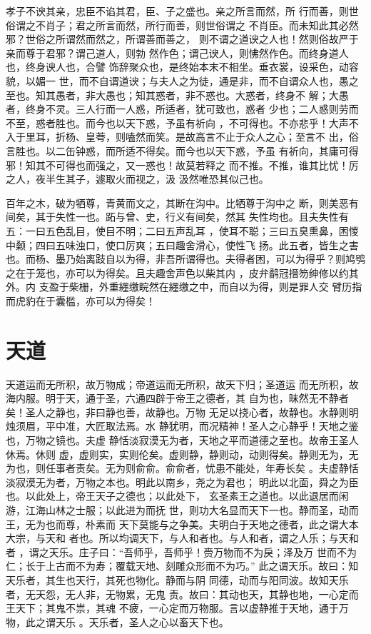 \documentclass[a4paper,12pt,UTF8,twoside]{ctexbook}
\begin{document}
孝子不谀其亲，忠臣不谄其君，臣、子之盛也。亲之所言而然，所 行而善，则世俗谓之不肖子；君之所言而然，所行而善，则世俗谓之 不肖臣。而未知此其必然邪？世俗之所谓然而然之，所谓善而善之， 则不谓之道谀之人也！然则俗故严于亲而尊于君邪？谓己道人，则勃 然作色；谓己谀人，则怫然作色。而终身道人也，终身谀人也，合譬 饰辞聚众也，是终始本末不相坐。垂衣裳，设采色，动容貌，以媚一 世，而不自谓道谀；与夫人之为徒，通是非，而不自谓众人也，愚之 至也。知其愚者，非大愚也；知其惑者，非不惑也。大惑者，终身不 解；大愚者，终身不灵。三人行而一人惑，所适者，犹可致也，惑者 少也；二人惑则劳而不至，惑者胜也。而今也以天下惑，予虽有祈向 ，不可得也。不亦悲乎！大声不入于里耳，折杨、皇荂，则嗑然而笑。是故高言不止于众人之心；至言不 出，俗言胜也。以二缶钟惑，而所适不得矣。而今也以天下惑，予虽 有祈向，其庸可得邪！知其不可得也而强之，又一惑也！故莫若释之 而不推。不推，谁其比忧！厉之人，夜半生其子，遽取火而视之，汲 汲然唯恐其似己也。

百年之木，破为牺尊，青黄而文之，其断在沟中。比牺尊于沟中之 断，则美恶有间矣，其于失性一也。跖与曾、史，行义有间矣，然其 失性均也。且夫失性有五：一曰五色乱目，使目不明；二曰五声乱耳 ，使耳不聪；三曰五臭熏鼻，困惾中颡；四曰五味浊口，使口厉爽；五曰趣舍滑心，使性飞 扬。此五者，皆生之害也。而杨、墨乃始离跂自以为得，非吾所谓得也。夫得者困，可以为得乎？则鸠鸮之在于笼也，亦可以为得矣。且夫趣舍声色以柴其内 ，皮弁鹬冠搢笏绅修以约其外。内 支盈于柴栅，外重纆缴睆然在纆缴之中，而自以为得，则是罪人交 臂历指而虎豹在于囊槛，亦可以为得矣！

\section{天道}

天道运而无所积，故万物成；帝道运而无所积，故天下归；圣道运 而无所积，故海内服。明于天，通于圣，六通四辟于帝王之德者，其 自为也，昧然无不静者矣！圣人之静也，非曰静也善，故静也。万物 无足以挠心者，故静也。水静则明烛须眉，平中准，大匠取法焉。水 静犹明，而况精神！圣人之心静乎！天地之鉴也，万物之镜也。夫虚 静恬淡寂漠无为者，天地之平而道德之至也。故帝王圣人休焉。休则 虚，虚则实，实则伦矣。虚则静，静则动，动则得矣。静则无为，无 为也，则任事者责矣。无为则俞俞。俞俞者，忧患不能处，年寿长矣 。夫虚静恬淡寂漠无为者，万物之本也。明此以南乡，尧之为君也； 明此以北面，舜之为臣也。以此处上，帝王天子之德也；以此处下， 玄圣素王之道也。以此退居而闲游，江海山林之士服；以此进为而抚 世，则功大名显而天下一也。静而圣，动而王，无为也而尊，朴素而 天下莫能与之争美。夫明白于天地之德者，此之谓大本大宗，与天和 者也。所以均调天下，与人和者也。与人和者，谓之人乐；与天和者 ，谓之天乐。庄子曰：“吾师乎，吾师乎！赍万物而不为戾；泽及万 世而不为仁；长于上古而不为寿；覆载天地、刻雕众形而不为巧。” 此之谓天乐。故曰：知天乐者，其生也天行，其死也物化。静而与阴 同德，动而与阳同波。故知天乐者，无天怨，无人非，无物累，无鬼 责。故曰：其动也天，其静也地，一心定而王天下；其鬼不祟，其魂 不疲，一心定而万物服。言以虚静推于天地，通于万物，此之谓天乐 。天乐者，圣人之心以畜天下也。
\end{document}
